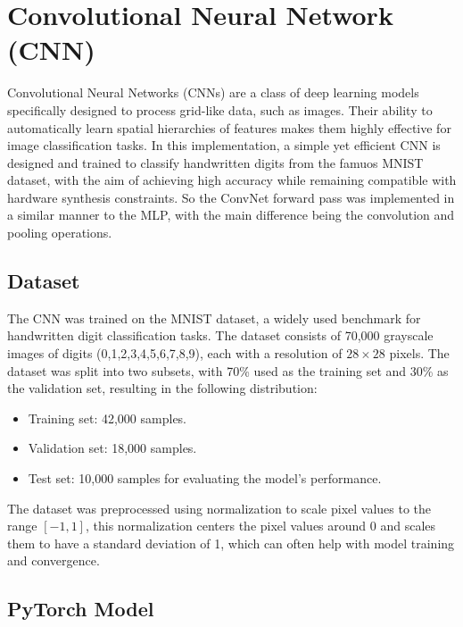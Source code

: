 \documentclass{article}
\begin{document}
\section{Convolutional Neural Network (CNN)}
Convolutional Neural Networks (CNNs) are a class of deep learning models specifically designed to process grid-like data, such as images. Their ability to automatically learn spatial hierarchies of features makes them highly effective for image classification tasks. In this implementation, a simple yet efficient CNN is designed and trained to classify handwritten digits from the famuos MNIST dataset, with the aim of achieving high accuracy while remaining compatible with hardware synthesis constraints. So the ConvNet forward pass was implemented in a similar manner to the MLP, with the main difference being the convolution and pooling operations.


\subsection{Dataset}
The CNN was trained on the MNIST dataset, a widely used benchmark for handwritten digit classification tasks. The dataset consists of 70,000 grayscale images of digits (0,1,2,3,4,5,6,7,8,9), each with a resolution of $28 \times 28$ pixels. The dataset was split into two subsets, with 70\% used as the training set and 30\% as the validation set, resulting in the following distribution:

\begin{itemize}
    \item Training set: 42,000 samples.
    \item Validation set: 18,000 samples.
    \item Test set: 10,000 samples for evaluating the model's performance.
\end{itemize}

The dataset was preprocessed using normalization to scale pixel values to the range $[-1, 1]$, this normalization centers the pixel values around 0 and scales them to have a standard deviation of 1, which can often help with model training and convergence.


\subsection{PyTorch Model}
\end{document}
